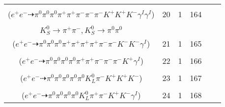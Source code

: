 \documentclass[landscape]{article}
\newcounter{rownumbers}
\newcommand\rn{\stepcounter{rownumbers}\arabic{rownumbers}}
\newcommand{\EOL}{\\} %
\newcommand{\topoTags}[1]{#1} %
\begin{document}
\begin{longtable}{clcccc}
\rn & \makecell[l]{ $ 
e^{+} e^{-} \rightarrow \pi^{0} \pi^{-} \pi^{-} \rho^{+} \bar{K}^{0} K^{+} K^{-} K^{*+} \gamma^{I} \gamma^{I} ,
\rho^{+} \rightarrow \pi^{0} \pi^{+} ,
\bar{K}^{0} \rightarrow K_{S}^{0} ,
K^{*+} \rightarrow \pi^{0} K^{+} ,
K_{S}^{0} \rightarrow \pi^{+} \pi^{-} 
$ \\ ($
e^{+} e^{-} \dashrightarrow \pi^{0} \pi^{0} \pi^{0} \pi^{+} \pi^{+} \pi^{-} \pi^{-} \pi^{-} K^{+} K^{+} K^{-} \gamma^{I} \gamma^{I} 
$) } & \topoTags{20 & }1 & 164 \EOL

\rn & \makecell[l]{ $ 
e^{+} e^{-} \rightarrow \pi^{+} \rho^{-} K^{0} K^{0} \bar{K}^{*} \bar{K}^{*} \gamma^{I} ,
\rho^{-} \rightarrow \pi^{0} \pi^{-} ,
K^{0} \rightarrow K_{S}^{0} ,
K^{0} \rightarrow K_{S}^{0} ,
\bar{K}^{*} \rightarrow \pi^{+} K^{-} ,
\bar{K}^{*} \rightarrow \pi^{+} K^{-} ,
$ \\ $
K_{S}^{0} \rightarrow \pi^{+} \pi^{-} ,
K_{S}^{0} \rightarrow \pi^{0} \pi^{0} 
$ \\ ($
e^{+} e^{-} \dashrightarrow \pi^{0} \pi^{0} \pi^{0} \pi^{+} \pi^{+} \pi^{+} \pi^{+} \pi^{-} \pi^{-} K^{-} K^{-} \gamma^{I} 
$) } & \topoTags{21 & }1 & 165 \EOL

\rn & \makecell[l]{ $ 
e^{+} e^{-} \rightarrow \pi^{0} \rho^{0} \rho^{0} \pi^{-} \bar{K}^{*} K^{+} \gamma^{I} ,
\rho^{0} \rightarrow \pi^{+} \pi^{-} ,
\rho^{0} \rightarrow \pi^{+} \pi^{-} ,
\bar{K}^{*} \rightarrow \pi^{0} \bar{K}^{0} ,
\bar{K}^{0} \rightarrow K_{S}^{0} ,
K_{S}^{0} \rightarrow \pi^{0} \pi^{0} 
$ \\ ($
e^{+} e^{-} \dashrightarrow \pi^{0} \pi^{0} \pi^{0} \pi^{0} \pi^{+} \pi^{+} \pi^{-} \pi^{-} \pi^{-} K^{+} \gamma^{I} 
$) } & \topoTags{22 & }1 & 166 \EOL

\rn & \makecell[l]{ $ 
e^{+} e^{-} \rightarrow \pi^{0} \pi^{0} \pi^{0} \pi^{-} \bar{K}^{*} K^{*+} \phi ,
\bar{K}^{*} \rightarrow \pi^{0} \bar{K}^{0} ,
K^{*+} \rightarrow \pi^{0} K^{+} ,
\phi \rightarrow K^{+} K^{-} ,
\bar{K}^{0} \rightarrow K_{L}^{0} 
$ \\ ($
e^{+} e^{-} \dashrightarrow \pi^{0} \pi^{0} \pi^{0} \pi^{0} \pi^{0} K_{L}^{0} \pi^{-} K^{+} K^{+} K^{-} 
$) } & \topoTags{23 & }1 & 167 \EOL

\rn & \makecell[l]{ $ 
e^{+} e^{-} \rightarrow \pi^{0} \rho^{0} K^{0} \bar{K}^{0} K^{-} K^{*+} \gamma^{I} ,
\rho^{0} \rightarrow \pi^{+} \pi^{-} ,
K^{0} \rightarrow K_{L}^{0} ,
\bar{K}^{0} \rightarrow K_{S}^{0} ,
K^{*+} \rightarrow \pi^{0} K^{+} ,
K_{S}^{0} \rightarrow \pi^{0} \pi^{0} 
$ \\ ($
e^{+} e^{-} \dashrightarrow \pi^{0} \pi^{0} \pi^{0} \pi^{0} K_{L}^{0} \pi^{+} \pi^{-} K^{+} K^{-} \gamma^{I} 
$) } & \topoTags{24 & }1 & 168 \EOL


\end{longtable}
\end{document}

